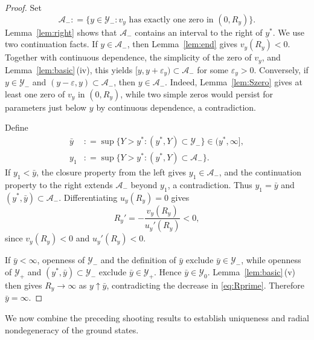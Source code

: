 \documentclass[12pt, a4paper, reqno]{amsart}
\numberwithin{equation}{section}
\theoremstyle{definition}
\theoremstyle{remark}
\newcommand{\ce}{\mathrel{\mathop:}=}
\begin{document}
\begin{proof}
Set
\[
  \mathcal A_-\ce
  \{y\in\mathcal Y_-:
    v_y\text{ has exactly one zero in }(0,R_y)\}.
\]
Lemma~\ref{lem:right} shows that $\mathcal A_-$ contains an interval
to the right of $y^*$. We use two continuation facts.
If $y\in\mathcal A_-$, then Lemma~\ref{lem:end} gives
$v_y(R_y)<0$. Together with continuous dependence, the simplicity
of the zero of $v_y$, and Lemma~\ref{lem:basic}\,\textup{(iv)}, this yields
$[y,y+\varepsilon_y)\subset\mathcal A_-$ for some $\varepsilon_y>0$.
Conversely, if $y\in\mathcal Y_-$ and
$(y-\varepsilon,y)\subset\mathcal A_-$, then $y\in\mathcal A_-$.
Indeed, Lemma~\ref{lem:Szero} gives at least one zero of $v_y$
in $(0,R_y)$, while two simple zeros would persist for parameters
just below $y$ by continuous dependence, a contradiction.

Define
\begin{align*}
  \bar y&\ce
  \sup\{Y>y^*:(y^*,Y)\subset\mathcal Y_-\}\in(y^*,\infty],\\
  y_1&\ce
  \sup\{Y>y^*:(y^*,Y)\subset\mathcal A_-\}.
\end{align*}
If $y_1<\bar y$, the closure property from the left gives
$y_1\in\mathcal A_-$, and the continuation property to the right
extends $\mathcal A_-$ beyond $y_1$, a contradiction.
Thus $y_1=\bar y$ and $(y^*,\bar y)\subset\mathcal A_-$.
Differentiating $u_y(R_y)=0$ gives
\begin{equation}\label{eq:Rprime}
  R_y'=-\frac{v_y(R_y)}{u_y'(R_y)}<0,
\end{equation}
since $v_y(R_y)<0$ and $u_y'(R_y)<0$.

If $\bar y<\infty$, openness of $\mathcal Y_-$ and the definition
of $\bar y$ exclude $\bar y\in\mathcal Y_-$, while openness of
$\mathcal Y_+$ and $(y^*,\bar y)\subset\mathcal Y_-$ exclude
$\bar y\in\mathcal Y_+$. Hence $\bar y\in\mathcal Y_0$.
Lemma~\ref{lem:basic}\,\textup{(v)} then gives $R_y\to\infty$ as
$y\uparrow\bar y$, contradicting the decrease in \eqref{eq:Rprime}.
Therefore $\bar y=\infty$.
\end{proof}

We now combine the preceding shooting results to establish
uniqueness and radial nondegeneracy of the ground states.
\end{document}
